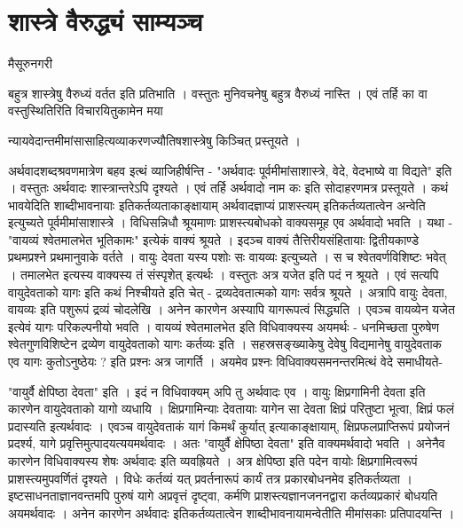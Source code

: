 {\fontsize{15}{17}\selectfont
\chapter{शास्त्रे वैरुद्ध्यं साम्यञ्च} 

\begin{center}
\smallskip

मैसूरुनगरी
\addrule
\end{center}

बहुत्र शास्त्रेषु वैरुध्यं वर्तत इति प्रतिभाति । वस्तुतः मुनिवचनेषु बहुत्र वैरुध्यं नास्ति । एवं तर्हि का वा वस्तुस्थितिरिति विचारयितुकामेन मया  

न्यायवेदान्तमीमांसासाहित्यव्याकरणज्यौतिषशास्त्रेषु किञ्चित् प्रस्तूयते ।

अर्थवादशब्दश्रवणमात्रेण बहव इत्थं व्याजिहीर्षन्ति - "अर्थवादः पूर्वमीमांसाशास्त्रे, वेदे, वेदभाष्ये वा विद्यते" इति । वस्तुतः अर्थवादः शास्त्रान्तरेऽपि दृश्यते । एवं तर्हि अर्थवादो नाम कः इति सोदाहरणमत्र प्रस्तूयते । कथं भावयेदिति शाब्दीभावनायाः इतिकर्तव्यताकाङ्क्षायाम् अर्थवादज्ञाप्यं प्राशस्त्यम् इतिकर्तव्यतात्वेन अन्वेति इत्युच्यते पूर्वमीमांसाशास्त्रे । विधिसन्निधौ श्रूयमाणः प्राशस्त्यबोधको वाक्यसमूह एव अर्थवादो भवति । यथा - "वायव्यं श्वेतमालभेत भूतिकामः" इत्येकं वाक्यं श्रूयते । इदञ्च वाक्यं तैत्तिरीयसंहितायाः द्वितीयकाण्डे प्रथमप्रश्ने प्रथमानुवाके वर्तते । वायुः देवता यस्य पशोः सः वायव्यः इत्युच्यते । स च श्वेतवर्णविशिष्टः भवेत् । तमालभेत इत्यस्य वाक्यस्य तं संस्पृशेत् इत्यर्थः । वस्तुतः अत्र यजेत इति पदं न श्रूयते । एवं सत्यपि वायुदेवताको यागः इति कथं निश्चीयते इति चेत् - द्रव्यदेवतात्मको यागः सर्वत्र श्रूयते । अत्रापि वायुः देवता, वायव्यः इति पशुरूपं द्रव्यं चोदलेखि । अनेन कारणेन अस्यापि यागरूपत्वं सिद्ध्यति । एवञ्च वायव्येन यजेत इत्येवं यागः परिकल्पनीयो भवति । वायव्यं श्वेतमालभेत इति विधिवाक्यस्य अयमर्थः - धनमिच्छता पुरुषेण श्वेतगुणविशिष्टेन द्रव्येण वायुदेवताको यागः कर्तव्यः इति । सहस्रसङ्ख्याकेषु देवेषु विद्यमानेषु वायुदेवताक एव यागः कुतोऽनुष्ठेयः ? इति प्रश्नः अत्र जागर्ति । अयमेव प्रश्नः विधिवाक्यसमनन्तरमित्थं वेदे समाधीयते-

"वायुर्वै क्षेपिष्ठा देवता" इति । इदं न विधिवाक्यम् अपि तु अर्थवादः एव । वायुः क्षिप्रगामिनी देवता इति कारणेन वायुदेवताको यागो व्यधायि । क्षिप्रगामिन्याः देवतायाः यागेन सा देवता क्षिप्रं परितुष्टा भूत्वा, क्षिप्रं फलं प्रदास्यति इत्यर्थवादः । एवञ्च वायुदेवताकं यागं किमर्थं कुर्यात् इत्याकाङ्क्षायाम्, क्षिप्रफलप्राप्तिरूपं प्रयोजनं प्रदर्श्य, यागे प्रवृत्तिमुत्पादयत्ययमर्थवादः । अतः "वायुर्वै क्षेपिष्ठा देवता" इति वाक्यमर्थवादो भवति । अनेनैव कारणेन  विधिवाक्यस्य शेषः अर्थवादः इति व्यवह्रियते । अत्र क्षेपिष्ठा इति पदेन वायोः क्षिप्रगामित्वरूपं प्राशस्त्यमुपवर्णितं दृश्यते । विधेः कर्तव्यं यत् प्रवर्तनारूपं कार्यं तत्र प्रकारबोधनमेव इतिकर्तव्यता । इष्टसाधनताज्ञानवन्तमपि पुरुषं यागे अप्रवृत्तं दृष्ट्वा, कर्मणि प्राशस्त्यज्ञानजननद्वारा कर्तव्यप्रकारं बोधयति अयमर्थवादः । अनेन कारणेन अर्थवादः इतिकर्तव्यतात्वेन शाब्दीभावनायामन्वेतीति मीमांसकाः प्रतिपादयन्ति ।

}
